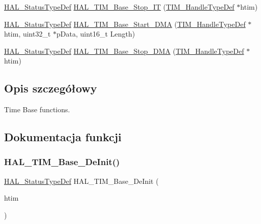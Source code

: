 \begin{DoxyCompactItemize}
\item 
\hyperlink{stm32f4xx__hal__def_8h_a63c0679d1cb8b8c684fbb0632743478f}{H\+A\+L\+\_\+\+Status\+Type\+Def} \hyperlink{group___t_i_m___exported___functions___group1_ga19443605c97f15b5ede7d8337534ece4}{H\+A\+L\+\_\+\+T\+I\+M\+\_\+\+Base\+\_\+\+Stop\+\_\+\+IT} (\hyperlink{struct_t_i_m___handle_type_def}{T\+I\+M\+\_\+\+Handle\+Type\+Def} $\ast$htim)
\item 
\hyperlink{stm32f4xx__hal__def_8h_a63c0679d1cb8b8c684fbb0632743478f}{H\+A\+L\+\_\+\+Status\+Type\+Def} \hyperlink{group___t_i_m___exported___functions___group1_ga8246aece4afe559642a6da298f7b157a}{H\+A\+L\+\_\+\+T\+I\+M\+\_\+\+Base\+\_\+\+Start\+\_\+\+D\+MA} (\hyperlink{struct_t_i_m___handle_type_def}{T\+I\+M\+\_\+\+Handle\+Type\+Def} $\ast$htim, uint32\+\_\+t $\ast$p\+Data, uint16\+\_\+t Length)
\item 
\hyperlink{stm32f4xx__hal__def_8h_a63c0679d1cb8b8c684fbb0632743478f}{H\+A\+L\+\_\+\+Status\+Type\+Def} \hyperlink{group___t_i_m___exported___functions___group1_ga7673776de6e35f5cbe887e62e13e87b5}{H\+A\+L\+\_\+\+T\+I\+M\+\_\+\+Base\+\_\+\+Stop\+\_\+\+D\+MA} (\hyperlink{struct_t_i_m___handle_type_def}{T\+I\+M\+\_\+\+Handle\+Type\+Def} $\ast$htim)
\end{DoxyCompactItemize}


\subsection{Opis szczegółowy}
Time Base functions. 



\subsection{Dokumentacja funkcji}
\mbox{\label{group___t_i_m___exported___functions___group1_gaaf97adbc39e48456a1c83c54895de83b}} 
\subsubsection{\texorpdfstring{H\+A\+L\+\_\+\+T\+I\+M\+\_\+\+Base\+\_\+\+De\+Init()}{HAL\_TIM\_Base\_DeInit()}}
{\footnotesize\ttfamily \hyperlink{stm32f4xx__hal__def_8h_a63c0679d1cb8b8c684fbb0632743478f}{H\+A\+L\+\_\+\+Status\+Type\+Def} H\+A\+L\+\_\+\+T\+I\+M\+\_\+\+Base\+\_\+\+De\+Init (\begin{DoxyParamCaption}\item[{\hyperlink{struct_t_i_m___handle_type_def}{T\+I\+M\+\_\+\+Handle\+Type\+Def} $\ast$}]{htim }\end{DoxyParamCaption})}

